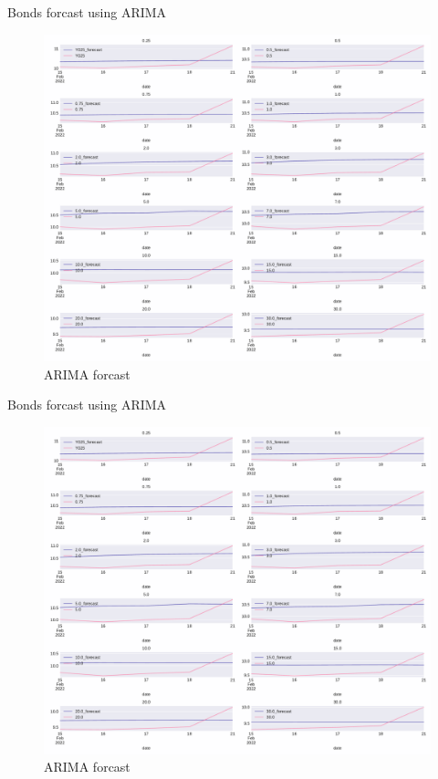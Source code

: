 \documentclass[aspectratio=169]{beamer}
\begin{document}
    \begin{frame}{Bonds forcast using ARIMA}
        \begin{figure}
            \includegraphics[scale=0.22]{fig/ARIMAfcst copy.pdf}
            \caption{ARIMA forcast}
            \label{fig:VARnsfcst}
        \end{figure}
    \end{frame}

    \begin{frame}{Bonds forcast using ARIMA}
        \begin{figure}
            \includegraphics[scale=0.22]{fig/ARIMAfcst copy.pdf}
            \caption{ARIMA forcast}
            \label{fig:VARnsfcst}
        \end{figure}
    \end{frame}
\end{document}
